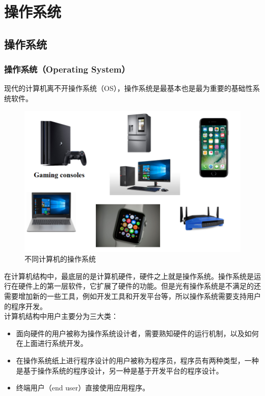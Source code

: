 \chapter{操作系统}

\section{操作系统}

\subsection{操作系统（Operating System）}

现代的计算机离不开操作系统（OS），操作系统是最基本也是最为重要的基础性系统软件。

\begin{figure}[H]
	\centering
	\includegraphics[scale=0.7]{img/C1/1-1/1.png}
	\caption{不同计算机的操作系统}
\end{figure}

在计算机结构中，最底层的是计算机硬件，硬件之上就是操作系统。操作系统是运行在硬件上的第一层软件，它扩展了硬件的功能。但是光有操作系统是不满足的还需要增加新的一些工具，例如开发工具和开发平台等，所以操作系统需要支持用户的程序开发。\\

计算机结构中用户主要分为三大类：

\begin{itemize}
	\item 面向硬件的用户被称为操作系统设计者，需要熟知硬件的运行机制，以及如何在上面进行系统开发。

	\item 在操作系统纸上进行程序设计的用户被称为程序员，程序员有两种类型，一种是基于操作系统的程序设计，另一种是基于开发平台的程序设计。

	\item 终端用户（end user）直接使用应用程序。
\end{itemize}

